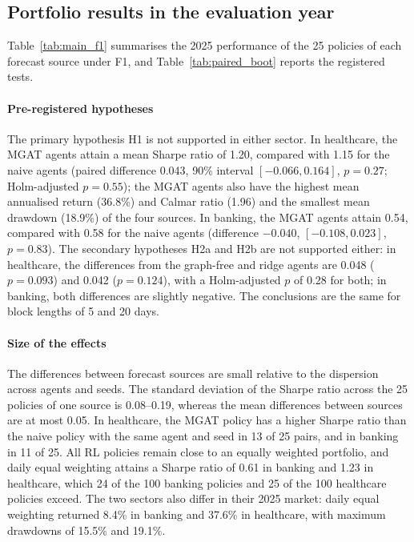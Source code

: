 \documentclass[pdflatex,sn-mathphys-num]{sn-jnl}%
\theoremstyle{thmstyleone}%
\theoremstyle{thmstyletwo}%
\theoremstyle{thmstylethree}%
\begin{document}
\subsection{Portfolio results in the evaluation year}\label{subsec:comparison}

{\color{blue}Table~\ref{tab:main_f1} summarises the 2025 performance of the 25 policies of each forecast source under F1, and Table~\ref{tab:paired_boot} reports the registered tests.

\paragraph{Pre-registered hypotheses}
The primary hypothesis H1 is not supported in either sector. In healthcare, the MGAT agents attain a mean Sharpe ratio of 1.20, compared with 1.15 for the naive agents (paired difference 0.043, 90\% interval $[-0.066, 0.164]$, $p=0.27$; Holm-adjusted $p=0.55$); the MGAT agents also have the highest mean annualised return (36.8\%) and Calmar ratio (1.96) and the smallest mean drawdown (18.9\%) of the four sources. In banking, the MGAT agents attain 0.54, compared with 0.58 for the naive agents (difference $-0.040$, $[-0.108, 0.023]$, $p=0.83$). The secondary hypotheses H2a and H2b are not supported either: in healthcare, the differences from the graph-free and ridge agents are 0.048 ($p=0.093$) and 0.042 ($p=0.124$), with a Holm-adjusted $p$ of 0.28 for both; in banking, both differences are slightly negative. The conclusions are the same for block lengths of 5 and 20 days.

\paragraph{Size of the effects}
The differences between forecast sources are small relative to the dispersion across agents and seeds. The standard deviation of the Sharpe ratio across the 25 policies of one source is 0.08--0.19, whereas the mean differences between sources are at most 0.05. In healthcare, the MGAT policy has a higher Sharpe ratio than the naive policy with the same agent and seed in 13 of 25 pairs, and in banking in 11 of 25. All RL policies remain close to an equally weighted portfolio, and daily equal weighting attains a Sharpe ratio of 0.61 in banking and 1.23 in healthcare, which 24 of the 100 banking policies and 25 of the 100 healthcare policies exceed. The two sectors also differ in their 2025 market: daily equal weighting returned 8.4\% in banking and 37.6\% in healthcare, with maximum drawdowns of 15.5\% and 19.1\%.\par}
\end{document}
